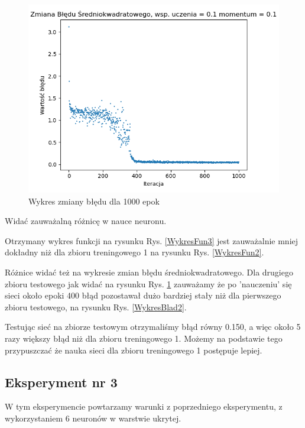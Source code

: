 \documentclass[12pt]{article}
\begin{document}
\begin{figure}[!htb]
 \centering
 \includegraphics[width=12cm]{ZmianaBledu4NeuronZbior2.png}
 \vspace{-0.3cm}
 \caption{Wykres zmiany błędu dla 1000 epok}
 \label{WykresBlad3}
\end{figure}

\newpage
Widać zauważalną różnicę w nauce neuronu.

Otrzymany wykres funkcji na rysunku Rys. \ref{WykresFun3} jest zauważalnie mniej dokładny niż dla zbioru treningowego 1 na rysunku Rys. \ref{WykresFun2}.

Różnice widać też na wykresie zmian błędu średniokwadratowego. Dla drugiego zbioru testowego jak widać na rysunku Rys. \ref{WykresBlad3} zauważamy że po 'nauczeniu' się sieci około epoki 400 błąd pozostawał dużo bardziej stały niż dla pierwszego zbioru testowego, na rysunku Rys. \ref{WykresBlad2}.

Testując sieć na zbiorze testowym otrzymaliśmy błąd równy 0.150, a więc około 5 razy większy błąd niż dla zbioru treningowego 1. Możemy na podstawie tego przypuszczać że nauka sieci dla zbioru treningowego 1 postępuje lepiej.
\newpage

\subsection{Eksperyment nr 3}
W tym eksperymencie powtarzamy warunki z poprzedniego eksperymentu, z wykorzystaniem 6 neuronów w warstwie ukrytej.
\end{document}
